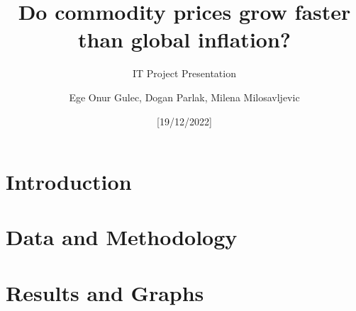 \documentclass{beamer}
\title[Commodity Price vs Inflation]{Do commodity prices grow faster than global inflation?}
\subtitle{IT Project Presentation}
\author[EOG, DP, MM]{Ege Onur Gulec, Dogan Parlak, Milena Milosavljevic}
\date{[19/12/2022]}
\begin{document}
\begin{frame}
\titlepage
\end{frame}


\section{Introduction}


\section{Data and Methodology}


\section{Results and Graphs}

\end{document}
